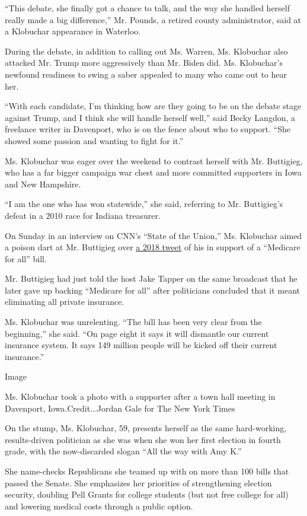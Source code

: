``This debate, she finally got a chance to talk, and the way she handled
herself really made a big difference,'' Mr. Pounds, a retired county
administrator, said at a Klobuchar appearance in Waterloo.

During the debate, in addition to calling out Ms. Warren, Ms. Klobuchar
also attacked Mr. Trump more aggressively than Mr. Biden did. Ms.
Klobuchar's newfound readiness to swing a saber appealed to many who
came out to hear her.

``With each candidate, I'm thinking how are they going to be on the
debate stage against Trump, and I think she will handle herself well,''
said Becky Langdon, a freelance writer in Davenport, who is on the fence
about who to support. ``She showed some passion and wanting to fight for
it.''

Ms. Klobuchar was eager over the weekend to contrast herself with Mr.
Buttigieg, who has a far bigger campaign war chest and more committed
supporters in Iowa and New Hampshire.

``I am the one who has won statewide,'' she said, referring to Mr.
Buttigieg's defeat in a 2010 race for Indiana treasurer.

On Sunday in an interview on CNN's ``State of the Union,'' Ms. Klobuchar
aimed a poison dart at Mr. Buttigieg over
\href{https://twitter.com/petebuttigieg/status/965396700511825920?lang=en}{a
2018 tweet} of his in support of a ``Medicare for all'' bill.

Mr. Buttigieg had just told the host Jake Tapper on the same broadcast
that he later gave up backing ``Medicare for all'' after politicians
concluded that it meant eliminating all private insurance.

Ms. Klobuchar was unrelenting. ``The bill has been very clear from the
beginning,'' she said. ``On page eight it says it will dismantle our
current insurance system. It says 149 million people will be kicked off
their current insurance.''

Image

Ms. Klobuchar took a photo with a supporter after a town hall meeting in
Davenport, Iowa.Credit...Jordan Gale for The New York Times

On the stump, Ms. Klobuchar, 59, presents herself as the same
hard-working, results-driven politician as she was when she won her
first election in fourth grade, with the now-discarded slogan ``All the
way with Amy K.''

She name-checks Republicans she teamed up with on more than 100 bills
that passed the Senate. She emphasizes her priorities of strengthening
election security, doubling Pell Grants for college students (but not
free college for all) and lowering medical costs through a public
option.

